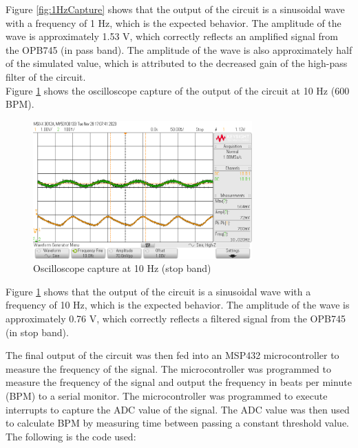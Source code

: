 \documentclass[CMPE]{KGCOEReport}
\begin{document}
Figure \ref{fig:1HzCapture} shows that the output of the circuit is a sinusoidal wave with a frequency of 1 Hz, which is the expected behavior. The amplitude of the wave is approximately 1.53 V, which correctly reflects an amplified signal from the OPB745 (in pass band). The amplitude of the wave is also approximately half of the simulated value, which is attributed to the decreased gain of the high-pass filter of the circuit.\\

Figure \ref{fig:10HzCapture} shows the oscilloscope capture of the output of the circuit at 10 Hz (600 BPM).

\begin{figure}[H]
    \centering
    \includegraphics[width=0.75\textwidth]{10Hz.png}
    \caption{Oscilloscope capture at 10 Hz (stop band)}
    \label{fig:10HzCapture}
\end{figure}

Figure \ref{fig:10HzCapture} shows that the output of the circuit is a sinusoidal wave with a frequency of 10 Hz, which is the expected behavior. The amplitude of the wave is approximately 0.76 V, which correctly reflects a filtered signal from the OPB745 (in stop band).

\bigskip

The final output of the circuit was then fed into an MSP432 microcontroller to measure the frequency of the signal. The microcontroller was programmed to measure the frequency of the signal and output the frequency in beats per minute (BPM) to a serial monitor. The microcontroller was programmed to execute interrupts to capture the ADC value of the signal. The ADC value was then used to calculate BPM by measuring time between passing a constant threshold value. The following is the code used:
\end{document}
